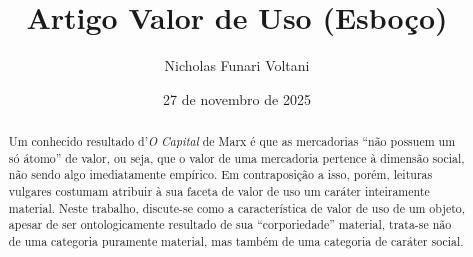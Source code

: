 \documentclass[12pt]{article}
\title{Artigo Valor de Uso (\textbf{Esboço})}
\author{Nicholas Funari Voltani}
\date{27 de novembro de 2025}
\begin{document}
\maketitle

\begin{abstract}
    Um conhecido resultado d'\textit{O Capital} de Marx é que as mercadorias ``não possuem um só átomo'' de valor, ou seja, que o valor de uma mercadoria pertence à dimensão social, não sendo algo imediatamente empírico. Em contraposição a isso, porém, leituras vulgares costumam atribuir à sua faceta de valor de uso um caráter inteiramente material. Neste trabalho, discute-se como a característica de valor de uso de um objeto, apesar de ser ontologicamente resultado de sua ``corporiedade'' material, trata-se não de uma categoria puramente material, mas também de uma categoria de caráter social.
\end{abstract}




\end{document}
